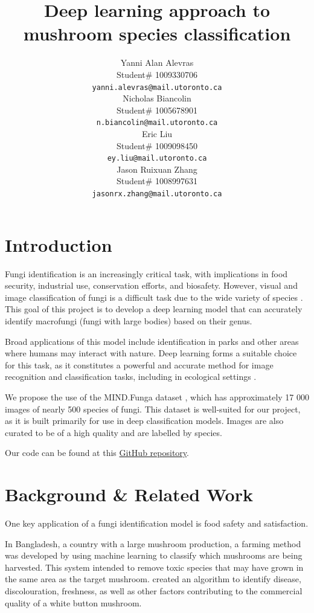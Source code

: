 \documentclass{article} %
\title{Deep learning approach to  \\ 
mushroom species classification}
\author{Yanni Alan Alevras  \\
Student\# 1009330706 \\
\texttt{yanni.alevras@mail.utoronto.ca} \\
\And
Nicholas Biancolin  \\
Student\# 1005678901 \\
\texttt{n.biancolin@mail.utoronto.ca} \\
\AND
Eric Liu  \\
Student\# 1009098450 \\
\texttt{ey.liu@mail.utoronto.ca} \\
\And
Jason Ruixuan Zhang \\
Student\# 1008997631 \\
\texttt{jasonrx.zhang@mail.utoronto.ca} \\
\AND
}
\begin{document}
\maketitle

\section{Introduction}
\label{intro}

Fungi identification is an increasingly critical task, with implications in food security, industrial use, conservation efforts, and biosafety. However, visual and image classification of fungi is a difficult task due to the wide variety of species \citep{LuckingAimeEtAl.UnambiguousIdentificationFungi.2020}. This goal of this project is to develop a deep learning model that can accurately identify macrofungi (fungi with large bodies) based on their genus.

Broad applications of this model include identification in parks and other areas where humans may interact with nature. Deep learning forms a suitable choice for this task, as it constitutes a powerful and accurate method for image recognition and classification tasks, including in ecological settings \citep{SchneiderTaylorEtAl.PresentFutureApproaches.2019}.

We propose the use of the MIND.Funga dataset \citep{Drechsler-SantosKarstedtEtAl.MINDFunga.2023}, which has approximately 17 000 images of nearly 500 species of fungi. This dataset is well-suited for our project, as it is built primarily for use in deep classification models. Images are also curated to be of a high quality and are labelled by species.

Our code can be found at this \href{https://github.com/nbiancolin/convolutional-neural-nuts}{GitHub repository}.

\section{Background \& Related Work}
\label{bg_related}

One key application of a fungi identification model is food safety and satisfaction.

In Bangladesh, a country with a large mushroom production, a farming method was developed by \cite{RahmanFaruqEtAl.IoTEnabledMushroom.2022} using machine learning to classify which mushrooms are being harvested. This system intended to remove toxic species that may have grown in the same area as the target mushroom. \cite{WangZhengEtAl.AutomaticSortingSystem.2018} created an algorithm to identify disease, discolouration, freshness, as well as other factors contributing to the commercial quality of a white button mushroom.
\end{document}
